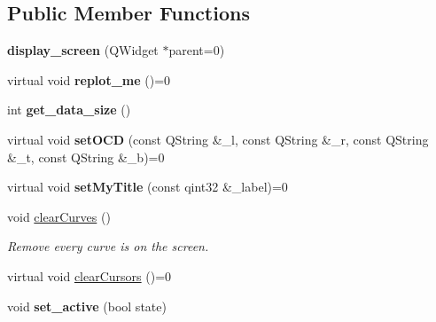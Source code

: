 \subsection*{Public Member Functions}
\begin{DoxyCompactItemize}
\item 
\mbox{\label{classdisplay__screen_a030b7a4cfc31bf2229ad29dd2301b0e3}} 
{\bfseries display\+\_\+screen} (Q\+Widget $\ast$parent=0)
\item 
\mbox{\label{classdisplay__screen_a8e55d078385c987e8720037361ef604e}} 
virtual void {\bfseries replot\+\_\+me} ()=0
\item 
\mbox{\label{classdisplay__screen_a27d55d66129e2f3b99314c73d5457eaf}} 
int {\bfseries get\+\_\+data\+\_\+size} ()
\item 
\mbox{\label{classdisplay__screen_a1c77889dda840e1c37fc89d9a36b6931}} 
virtual void {\bfseries set\+O\+CD} (const Q\+String \&\+\_\+l, const Q\+String \&\+\_\+r, const Q\+String \&\+\_\+t, const Q\+String \&\+\_\+b)=0
\item 
\mbox{\label{classdisplay__screen_ac21347fc9744e48f10d498a6eb784358}} 
virtual void {\bfseries set\+My\+Title} (const qint32 \&\+\_\+label)=0
\item 
\mbox{\label{classdisplay__screen_a85b97edfde46cbe8136877c35bb6876d}} 
void \mbox{\hyperlink{classdisplay__screen_a85b97edfde46cbe8136877c35bb6876d}{clear\+Curves}} ()
\begin{DoxyCompactList}\small\item\em Remove every curve is on the screen. \end{DoxyCompactList}\item 
virtual void \mbox{\hyperlink{classdisplay__screen_aedda58c57969f054fb9bedd1ed01b62c}{clear\+Cursors}} ()=0
\item 
\mbox{\label{classdisplay__screen_ac2ef804e167c1ba941dcf91134bbe769}} 
void {\bfseries set\+\_\+active} (bool state)
\item 
\mbox{\label{classdisplay__screen_ac64b0a65402d794e135c6c6e189d02a6}} 

\end{DoxyCompactItemize}

